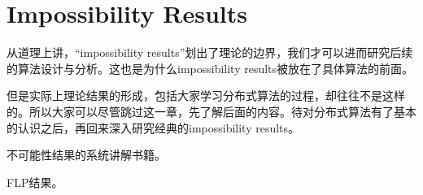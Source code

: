 \chapter{Impossibility Results}

从道理上讲，“impossibility results”划出了理论的边界，我们才可以进而研究后续的算法设计与分析。这也是为什么impossibility results被放在了具体算法的前面。

但是实际上理论结果的形成，包括大家学习分布式算法的过程，却往往不是这样的。所以大家可以尽管跳过这一章，先了解后面的内容。待对分布式算法有了基本的认识之后，再回来深入研究经典的impossibility results。

\begin{theorem}
    
     不可能性结果的系统讲解书籍。
    
\end{theorem}

\begin{theorem}
    
    FLP结果。
    
\end{theorem}
